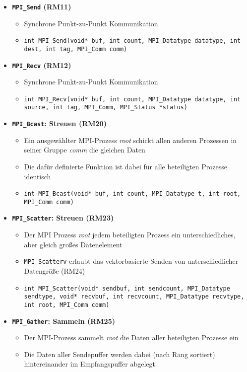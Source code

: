 \begin{itemize}
	\item \textbf{\texttt{MPI\_Send} (RM11)}
	\begin{itemize}
		\item Synchrone Punkt-zu-Punkt Kommunikation
		\item \texttt{int MPI\_Send(void* buf, int count, MPI\_Datatype datatype, int dest, int tag, MPI\_Comm comm)}
	\end{itemize}
	\item \textbf{\texttt{MPI\_Recv} (RM12)}
	\begin{itemize}
		\item Synchrone Punkt-zu-Punkt Kommunikation
		\item \texttt{int MPI\_Recv(void* buf, int count, MPI\_Datatype datatype, int source, int tag, MPI\_Comm, MPI\_Status *status)}
	\end{itemize}
	\item \textbf{\texttt{MPI\_Bcast}: Streuen (RM20)}
	\begin{itemize}
		\item Ein ausgewählter MPI-Prozess \textit{root} schickt allen anderen Prozessen in seiner Gruppe \textit{comm} die gleichen Daten
		\item Die dafür definierte Funktion ist dabei für alle beteiligten Prozesse identisch
		\item \texttt{int MPI\_Bcast(void* buf, int count, MPI\_Datatype t, int root, MPI\_Comm comm)}
	\end{itemize}
	\item \textbf{\texttt{MPI\_Scatter}: Streuen (RM23)}
	\begin{itemize}
		\item Der MPI Prozess \textit{root} jedem beteiligten Prozess ein unterschiedliches, aber gleich großes Datenelement
		\item \texttt{MPI\_Scatterv} erlaubt das vektorbasierte Senden von unterschiedlicher Datengröße (RM24)
		\item \texttt{int MPI\_Scatter(void* sendbuf, int sendcount, MPI\_Datatype sendtype, void* recvbuf, int recvcount, MPI\_Datatype recvtype, int root, MPI\_Comm comm)}
	\end{itemize}
	\item \textbf{\texttt{MPI\_Gather}: Sammeln (RM25)}
	\begin{itemize}
		\item Der MPI-Prozess sammelt \textit{root} die Daten aller beteiligten Prozesse ein
		\item Die Daten aller Sendepuffer werden dabei (nach Rang sortiert) hintereinander im Empfangspuffer abgelegt

\end{itemize}
\end{itemize}
